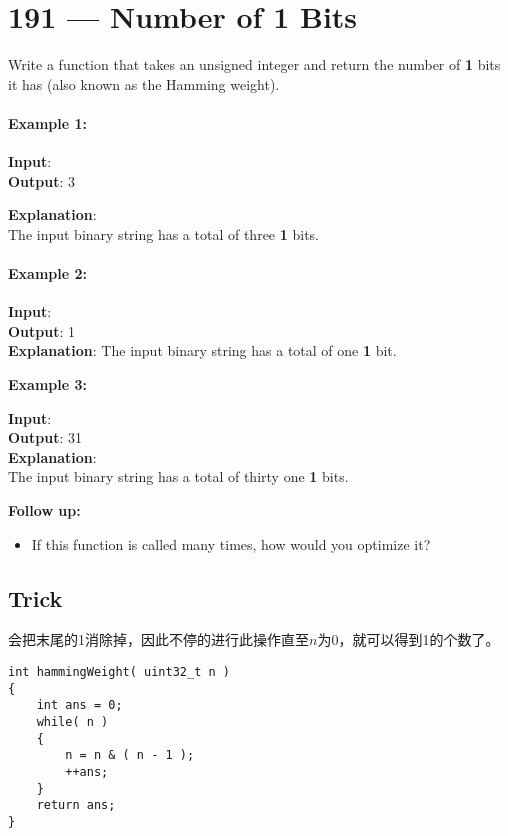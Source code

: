 \section{191 --- Number of 1 Bits}
Write a function that takes an unsigned integer and return the number of \textbf{1} bits it has (also known as the Hamming weight).
\paragraph{Example 1:}
\begin{flushleft}
\textbf{Input}: 
\\
\textbf{Output}: 3

\textbf{Explanation}: 
\\
The input binary string  has a total of three \textbf{1} bits.
\end{flushleft}
\paragraph{Example 2:}
\begin{flushleft}
\textbf{Input}: 
\\
\textbf{Output}: 1
\\
\textbf{Explanation}: The input binary string  has a total of one \textbf{1} bit.
\end{flushleft}
\textbf{Example 3:}
\begin{flushleft}
\textbf{Input}: 
\\
\textbf{Output}: 31
\\
\textbf{Explanation}:
\\
The input binary string  has a total of thirty one \textbf{1} bits.
\end{flushleft}
\textbf{Follow up:}
\begin{itemize}
\item If this function is called many times, how would you optimize it?
\end{itemize}
\subsection{Trick}
 会把末尾的1消除掉，因此不停的进行此操作直至$n$为0，就可以得到1的个数了。
\setcounter{lstlisting}{0}
\begin{lstlisting}[style=customc, caption={Bit Tricks}]
int hammingWeight( uint32_t n )
{
    int ans = 0;
    while( n )
    {
        n = n & ( n - 1 );
        ++ans;
    }
    return ans;
}
\end{lstlisting}